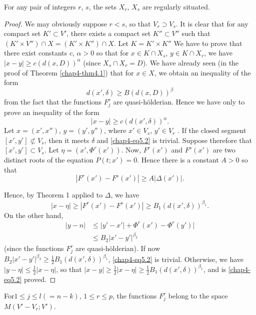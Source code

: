 \begin{proposition}\label{chap4-prop5.1}
  For any pair of integers $r$, $s$, the sets $X_r$, $X_s$ are regularly situated. 
\end{proposition}

\begin{proof}
  We may obviously suppose $r <s$, so that $V_r \supset V_s$. It is clear that for any compact set $K' \subset V'$, there exists a compact set $K'' \subset V''$ such that $(K' \times V'') \cap X = (K' \times K'') \cap X$. Let $K = K' \times K''$ We have to prove that there exist constants $c$, $\alpha > 0$ so that for $x \in K \cap X_s$, $y \in K \cap X_r$, we have $|x-y| \geq c (d(x, D))^\alpha$ (since $X_s \cap X_r = D$). We have already seen (in the proof of Theorem \ref{chap4-thm4.1}) that for $x \in X$, we obtain an inequality of the form
  $$
d (x', \delta) \geq B (d(x, D))^\beta
$$
from the fact that the functions $F^r_j$ are quasi-h\"olderian. Hence we have only to prove an inequality of the form
\setcounter{equation}{1}
\begin{equation}
  |x-y| \geq c(d(x', \delta))^\alpha.   \label{chap4-eq5.2}
\end{equation}
Let $ x = (x', x'')$, $y = (y', y'')$, where $x' \in V_s$, $y' \in V_r$ . If the closed segment $[x', y'] \not\subset V_s$, then it meets $\delta$ and \eqref{chap4-eq5.2} is trivial. Suppose therefore that $[x', y'] \subset V_s$. Let $\eta  = (x', \Phi^r (x'))$. Now, $F^r(x')$ and $F^s(x')$ are two distinct roots of the equation $P(t; x') =0$. Hence there is a constant $A>0$ so that
$$
|F^r (x') - F^s (x')| \geq A |\Delta (x')|.
$$

Hence, by Theorem 1 applied to $\Delta$, we have
$$
|x - \eta| \geq |F^r (x') - F^s (x')|  \geq B_1 (d(x', \delta))^{\beta_1}.
$$
On the other hand,
\begin{align*} 
  |y - n | &  \leq |y' - x'| + \Phi^r (x') - \Phi^r (y') |\\
  & \leq B_2 |x' - y'|^{\beta_2} \tag{5.3}\label{chap4-eq5.3}
\end{align*} 
(since the functions $F^r_j$ are quasi-h\"olderian). If now $B_2 |x'- y'|^{\beta_2} \geq \frac{1}{2} B_1 (d (x', \delta))^{\beta_1}$, \eqref{chap4-eq5.2} is trivial. Otherwise, we have $|y - \eta| \leq \frac{1}{2} |x - \eta|$, so that $|x - y| \geq \frac{1}{2} |x - \eta| \geq \frac{1}{2} B_1 (d (x', \delta))^{\beta_1}$, and  is \eqref{chap4-eq5.2} proved.
\end{proof} 

\setcounter{theorem}{2}
\begin{proposition}\label{chap4-prop5.3}%
  For\pageoriginale $1 \leq j \leq l (= n - k)$, $1 \leq r \leq p $, the functions $F^r_j$ belong to the space $M (V'-V_r ; V')$.
\end{proposition}

